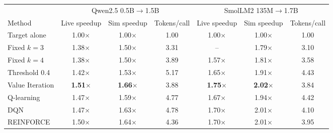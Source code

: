 \begin{tabular}{@{}lcccccc@{}}
\toprule
 & \multicolumn{3}{c}{Qwen2.5 0.5B$\to$1.5B} & \multicolumn{3}{c}{SmolLM2 135M$\to$1.7B} \\
\cmidrule(lr){2-4}\cmidrule(lr){5-7}
Method & Live speedup & Sim speedup & Tokens/call & Live speedup & Sim speedup & Tokens/call \\
\midrule
Target alone & 1.00$\times$ & 1.00$\times$ & 1.00 & 1.00$\times$ & 1.00$\times$ & 1.00 \\
Fixed $k=3$ & 1.38$\times$ & 1.50$\times$ & 3.31 & -- & 1.79$\times$ & 3.10 \\
Fixed $k=4$ & 1.38$\times$ & 1.50$\times$ & 3.89 & 1.57$\times$ & 1.81$\times$ & 3.58 \\
\midrule
Threshold 0.4 & 1.42$\times$ & 1.53$\times$ & 5.17 & 1.65$\times$ & 1.91$\times$ & 4.43 \\
\midrule
Value Iteration & \textbf{1.51$\times$} & \textbf{1.66$\times$} & 3.88 & \textbf{1.75$\times$} & \textbf{2.02$\times$} & 3.84 \\
Q-learning & 1.47$\times$ & 1.59$\times$ & 4.77 & 1.67$\times$ & 1.94$\times$ & 4.42 \\
DQN & 1.47$\times$ & 1.63$\times$ & 4.78 & 1.70$\times$ & 2.01$\times$ & 4.10 \\
REINFORCE & 1.50$\times$ & 1.64$\times$ & 4.36 & 1.70$\times$ & 2.01$\times$ & 3.95 \\
\bottomrule
\end{tabular}